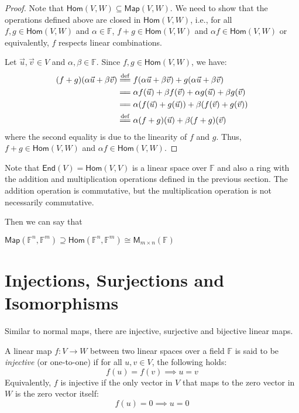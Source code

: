 \documentclass[
	11pt, %
	fleqn, %
	a4paper, %
]{LegrandOrangeBook}
\newcommand{\End}[1]{\mathsf{End}(#1)} %
\newcommand{\Hom}{\mathsf{Hom}} %
\newcommand{\F}{\mathbb{F}} %
\newcommand{\M}[2]{\mathsf{M}_{#1}(#2)} %
\newcommand{\Map}{\mathsf{Map}} %
\begin{document}
\begin{proof}
    Note that $\Hom(V, W) \subseteq \Map(V, W)$. We need to show that the operations defined above are closed in $\Hom(V, W)$, i.e., for all $f, g \in \Hom(V, W)$ and $\alpha \in \F$, $f + g \in \Hom(V, W)$ and $\alpha f \in \Hom(V, W)$ or equivalently, $f$ respects linear combinations.

    Let $\vec{u}, \vec{v} \in V$ and $\alpha, \beta \in \F$. Since $f, g \in \Hom(V, W)$, we have:
    \[
        \begin{split}
            (f + g)(\alpha\vec{u} + \beta\vec{v}) &\overset{\mathrm{def}}{=\joinrel=} f(\alpha\vec{u} + \beta\vec{v}) + g(\alpha\vec{u} + \beta\vec{v}) \\
            &=\joinrel= \alpha f(\vec{u}) + \beta f(\vec{v}) + \alpha g(\vec{u}) + \beta g(\vec{v}) \\
            &=\joinrel= \alpha (f(\vec{u}) + g(\vec{u})) + \beta (f(\vec{v}) + g(\vec{v})) \\
            &\overset{\mathrm{def}}{=\joinrel=} \alpha (f + g)(\vec{u}) + \beta (f + g)(\vec{v})
        \end{split}
    \]
    where the second equality is due to the linearity of $f$ and $g$. Thus, $f + g \in \Hom(V, W)$ and $\alpha f \in \Hom(V, W)$.
\end{proof}

\begin{remark}
    Note that $\End{V} = \Hom(V, V)$ is a linear space over $\F$ and also a ring with the addition and multiplication operations defined in the previous section. The addition operation is commutative, but the multiplication operation is not necessarily commutative.
\end{remark}

Then we can say that 
\begin{center}
    $\Map(\F^n, \F^m) \supseteq \Hom(\F^n, \F^m) \cong \M{m \times n}{\F}$
\end{center}


\newpage

\section{Injections, Surjections and Isomorphisms}

Similar to normal maps, there are injective, surjective and bijective linear maps.

\begin{definition}
    A linear map $f: V \to W$ between two linear spaces over a field $\F$ is said to be \emph{injective} (or one-to-one) if for all $u, v \in V$, the following holds:
    \[
        f(u) = f(v) \implies u = v
    \]
    Equivalently, $f$ is injective if the only vector in $V$ that maps to the zero vector in $W$ is the zero vector itself:
    \[
        f(u) = 0 \implies u = 0
    \]
\end{definition}
\end{document}
